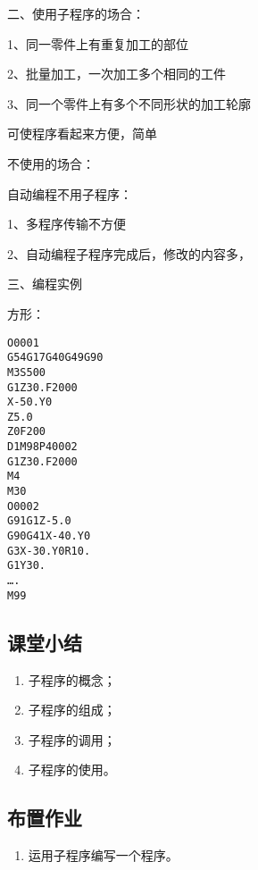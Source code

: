 二、使用子程序的场合：

1、同一零件上有重复加工的部位

2、批量加工，一次加工多个相同的工件

3、同一个零件上有多个不同形状的加工轮廓

可使程序看起来方便，简单

不使用的场合：

自动编程不用子程序：


1、多程序传输不方便

2、自动编程子程序完成后，修改的内容多，

三、编程实例

方形：

\begin{lstlisting}
O0001
G54G17G40G49G90
M3S500
G1Z30.F2000
X-50.Y0
Z5.0
Z0F200
D1M98P40002
G1Z30.F2000
M4
M30
O0002
G91G1Z-5.0
G90G41X-40.Y0
G3X-30.Y0R10.
G1Y30.
….
M99
\end{lstlisting}

\subsection{课堂小结}
\begin{enumerate}[1、]
	\item 子程序的概念；
	\item 子程序的组成；
	\item 子程序的调用；
	\item 子程序的使用。
\end{enumerate}

\vfill
\subsection{布置作业}
\begin{enumerate}[1、]
	\item 运用子程序编写一个程序。 
\end{enumerate}
\vfill